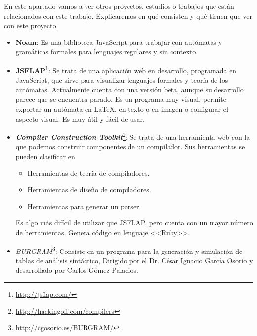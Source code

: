 
En este apartado vamos a ver otros proyectos, estudios o trabajos que están relacionados con este trabajo. Explicaremos en qué consisten y qué tienen que ver con este proyecto.

\begin{itemize}

\item \textbf{Noam}: Es una biblioteca JavaScript para trabajar con autómatas y gramáticas formales para lenguajes regulares y sin contexto.

\item \textbf{JSFLAP}\footnote{\url{http://jsflap.com/}}: Se trata de una aplicación web en desarrollo, programada en JavaScript, que sirve para visualizar lenguajes formales y teoría de los autómatas. Actualmente cuenta con una versión beta, aunque su desarrollo parece que se encuentra parado. Es un programa muy visual, permite exportar un autómata en \LaTeX, en texto o en imagen o configurar el aspecto visual. Es muy útil y fácil de usar.


\item \emph{\textbf{Compiler Construction Toolkit}}\footnote{\url{http://hackingoff.com/compilers}}: Se trata de una herramienta web con la que podemos construir componentes de un compilador. Sus herramientas se pueden clasificar en
\begin{itemize}
\item Herramientas de teoría de compiladores.
\item Herramientas de diseño de compiladores.
\item Herramientas para generar un parser.
\end{itemize}
Es algo más difícil de utilizar que JSFLAP, pero cuenta con un mayor número de herramientas. Genera código en lenguaje <<Ruby>>.

\item \emph{BURGRAM}\footnote{\url{http://cgosorio.es/BURGRAM/}}: Consiste en un programa para la generación y simulación de tablas de análisis sintáctico, Dirigido por el Dr. César Ignacio García Osorio y desarrollado por Carlos Gómez Palacios.
\end{itemize}